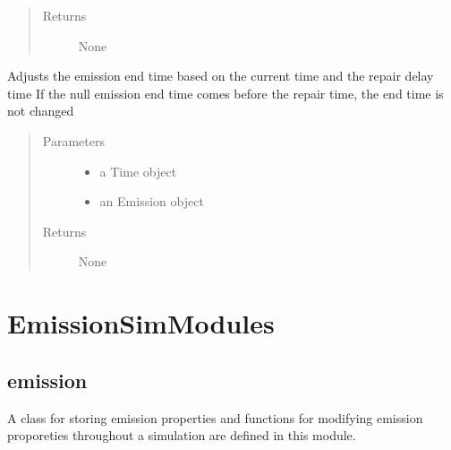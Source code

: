 \documentclass[letterpaper,10pt,english]{sphinxmanual}
\begin{document}
\begin{fulllineitems}
\begin{fulllineitems}
\begin{quote}
\begin{description}
\begin{itemize}
\end{itemize}

\item[{Returns}] \leavevmode
None

\end{description}\end{quote}

\end{fulllineitems}


\begin{fulllineitems}
\label{\detokenize{index:feast.DetectionModules.repair.Repair.repair}}
Adjusts the emission end time based on the current time and the repair delay time
If the null emission end time comes before the repair time, the end time is not changed
\begin{quote}\begin{description}
\item[{Parameters}] \leavevmode\begin{itemize}
\item {} 
 \textendash{} a Time object

\item {} 
 \textendash{} an Emission object

\end{itemize}

\item[{Returns}] \leavevmode
None

\end{description}\end{quote}

\end{fulllineitems}


\end{fulllineitems}



\section{EmissionSimModules}
\label{\detokenize{index:emissionsimmodules}}

\subsection{emission}
\label{\detokenize{index:module-feast.EmissionSimModules.emission_class_functions}}\label{\detokenize{index:emission}}
A class for storing emission properties and functions for modifying emission proporeties throughout a simulation are
defined in this module.
\end{document}
